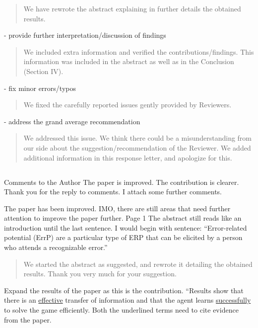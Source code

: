 \documentclass[journal,onecolumn,12pt]{IEEEtran}
\begin{document}
\begin{quotation}
{\color{blue}
We have rewrote the abstract explaining in further details the obtained results.  
}
\end{quotation}

- provide further interpretation/discussion of findings

\begin{quotation}
{\color{blue}
We included extra information and verified the contributions/findings.  This information was included in the abstract as well as in the Conclusion (Section IV).
}
\end{quotation}

- fix minor errors/typos

\begin{quotation}
{\color{blue}
We fixed the carefully reported issues gently provided by Reviewers.
}
\end{quotation}

- address the grand average recommendation

\begin{quotation}
{\color{blue}
We addressed this issue.  We think there could be a misunderstanding from our side about the suggestion/recommendation of the Reviewer.  We added additional information in this response letter, and apologize for this.
}
\end{quotation}

\subsection*{}

Comments to the Author
The paper is improved. The contribution is clearer. Thank you for the reply to comments. I attach some further comments.

The paper has been improved. IMO, there are still areas that need further attention to improve the paper further.
Page 1
The abstract still reads like an introduction until the last sentence.  I would begin with sentence: “Error-related potential (ErrP) are a particular type of ERP that can be elicited by a person who attends a recognizable error.”

\begin{quotation}
{\color{blue}
We started the abstract as suggested, and rewrote it detailing the obtained results.   Thank you very much for your suggestion.
}
\end{quotation}


Expand the results of the paper as this is the contribution.
“Results show that there is an  \underline{effective} transfer of information and that the agent learns \underline{successfully} to solve the game efficiently.
Both the underlined terms need to cite evidence from the paper.
\end{document}
